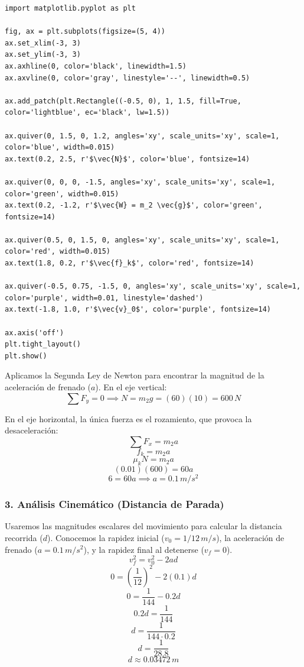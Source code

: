 \documentclass[12pt, a4paper]{article}
\begin{document}
\begin{lstlisting}
import matplotlib.pyplot as plt

fig, ax = plt.subplots(figsize=(5, 4))
ax.set_xlim(-3, 3)
ax.set_ylim(-3, 3)
ax.axhline(0, color='black', linewidth=1.5)
ax.axvline(0, color='gray', linestyle='--', linewidth=0.5)

ax.add_patch(plt.Rectangle((-0.5, 0), 1, 1.5, fill=True, color='lightblue', ec='black', lw=1.5))

ax.quiver(0, 1.5, 0, 1.2, angles='xy', scale_units='xy', scale=1, color='blue', width=0.015)
ax.text(0.2, 2.5, r'$\vec{N}$', color='blue', fontsize=14)

ax.quiver(0, 0, 0, -1.5, angles='xy', scale_units='xy', scale=1, color='green', width=0.015)
ax.text(0.2, -1.2, r'$\vec{W} = m_2 \vec{g}$', color='green', fontsize=14)

ax.quiver(0.5, 0, 1.5, 0, angles='xy', scale_units='xy', scale=1, color='red', width=0.015)
ax.text(1.8, 0.2, r'$\vec{f}_k$', color='red', fontsize=14)

ax.quiver(-0.5, 0.75, -1.5, 0, angles='xy', scale_units='xy', scale=1, color='purple', width=0.01, linestyle='dashed')
ax.text(-1.8, 1.0, r'$\vec{v}_0$', color='purple', fontsize=14)

ax.axis('off')
plt.tight_layout()
plt.show()
\end{lstlisting}

Aplicamos la Segunda Ley de Newton para encontrar la magnitud de la aceleración de frenado ($a$).
En el eje vertical:
\[ \sum F_y = 0 \implies N = m_2 g = (60)(10) = 600 \, \si{N} \]

En el eje horizontal, la única fuerza es el rozamiento, que provoca la desaceleración:
\[ \sum F_x = m_2 a \]
\[ f_k = m_2 a \]
\[ \mu_k N = m_2 a \]
\[ (0.01)(600) = 60 a \]
\[ 6 = 60 a \implies a = 0.1 \, \si{m/s^2} \]

\subsubsection*{3. Análisis Cinemático (Distancia de Parada)}
Usaremos las magnitudes escalares del movimiento para calcular la distancia recorrida ($d$). Conocemos la rapidez inicial ($v_0 = 1/12 \, \si{m/s}$), la aceleración de frenado ($a = 0.1 \, \si{m/s^2}$), y la rapidez final al detenerse ($v_f = 0$).
\[ v_f^2 = v_0^2 - 2 a d \]
\[ 0 = \left(\frac{1}{12}\right)^2 - 2(0.1) d \]
\[ 0 = \frac{1}{144} - 0.2 d \]
\[ 0.2 d = \frac{1}{144} \]
\[ d = \frac{1}{144 \cdot 0.2} \]
\[ d = \frac{1}{28.8} \]
\[ d \approx 0.03472 \, \si{m} \]
\end{document}

